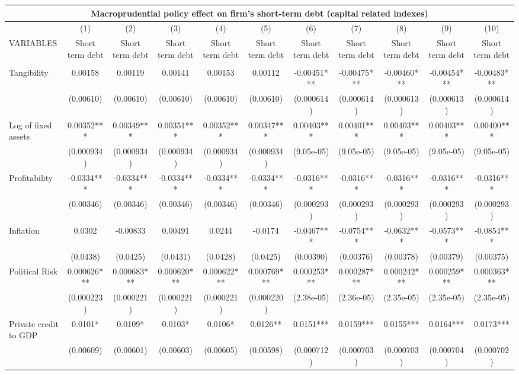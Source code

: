 \begin{tabular}{lcccccccccc}
\multicolumn{11}{c}{Macroprudential policy effect on firm's short-term debt (capital related indexes)} \\ \hline
 & (1) & (2) & (3) & (4) & (5) & (6) & (7) & (8) & (9) & (10) \\
VARIABLES & Short term debt & Short term debt & Short term debt & Short term debt & Short term debt & Short term debt & Short term debt & Short term debt & Short term debt & Short term debt \\ \hline
 &  &  &  &  &  &  &  &  &  &  \\
Tangibility & 0.00158 & 0.00119 & 0.00141 & 0.00153 & 0.00112 & -0.00451*** & -0.00475*** & -0.00460*** & -0.00454*** & -0.00483*** \\
 & (0.00610) & (0.00610) & (0.00610) & (0.00610) & (0.00610) & (0.000614) & (0.000614) & (0.000613) & (0.000613) & (0.000614) \\
Log of fixed assets & 0.00352*** & 0.00349*** & 0.00351*** & 0.00352*** & 0.00347*** & 0.00403*** & 0.00401*** & 0.00403*** & 0.00403*** & 0.00400*** \\
 & (0.000934) & (0.000934) & (0.000934) & (0.000934) & (0.000934) & (9.05e-05) & (9.05e-05) & (9.05e-05) & (9.05e-05) & (9.05e-05) \\
Profitability & -0.0334*** & -0.0334*** & -0.0334*** & -0.0334*** & -0.0334*** & -0.0316*** & -0.0316*** & -0.0316*** & -0.0316*** & -0.0316*** \\
 & (0.00346) & (0.00346) & (0.00346) & (0.00346) & (0.00346) & (0.000293) & (0.000293) & (0.000293) & (0.000293) & (0.000293) \\
Inflation & 0.0302 & -0.00833 & 0.00491 & 0.0244 & -0.0174 & -0.0467*** & -0.0754*** & -0.0632*** & -0.0573*** & -0.0854*** \\
 & (0.0438) & (0.0425) & (0.0431) & (0.0428) & (0.0425) & (0.00390) & (0.00376) & (0.00378) & (0.00379) & (0.00375) \\
Political Risk & 0.000626*** & 0.000683*** & 0.000620*** & 0.000622*** & 0.000769*** & 0.000253*** & 0.000287*** & 0.000242*** & 0.000259*** & 0.000363*** \\
 & (0.000223) & (0.000221) & (0.000221) & (0.000221) & (0.000220) & (2.38e-05) & (2.36e-05) & (2.35e-05) & (2.35e-05) & (2.35e-05) \\
Private credit to GDP & 0.0101* & 0.0109* & 0.0103* & 0.0106* & 0.0126** & 0.0151*** & 0.0159*** & 0.0155*** & 0.0164*** & 0.0173*** \\
 & (0.00609) & (0.00601) & (0.00603) & (0.00605) & (0.00598) & (0.000712) & (0.000703) & (0.000703) & (0.000704) & (0.000702) \\

\end{tabular}
